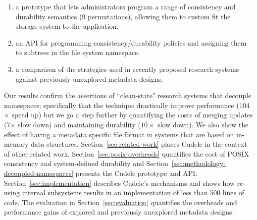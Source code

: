 \begin{enumerate}

  \item a prototype that lets administrators program a range of
  consistency and durability semantics (9 permutations), allowing them to custom
  fit the storage system to the application.

  \item an API for programming consistency/durability policies and assigning
  them to subtrees in the file system namespace.

  \item a comparison of the strategies used in recently proposed research systems against
  previously unexplored metadata designs.

\end{enumerate}

Our results confirm the assertions of ``clean-state" research systems that
decouple namespaces; specifically that the technique drastically improve
performance (104\(\times\) speed up) but we go a step further by quantifying
the costs of merging updates (7\(\times\) slow down) and maintaining durability
(\(10\times\) slow down). We also show the effect of having a metadata specific
file format in systems that are based on in-memory data structures.
Section~\ref{sec:related-work} places Cudele in the context of other related
work. Section~\ref{sec:posix-overheads} quantifies the cost of POSIX
consistency and system-defined durability and
Section~\ref{sec:methodology-decoupled-namespaces} presents the Cudele
prototype and API. Section~\ref{sec:implementation} describes Cudele's
mechanisms and shows how re-using internal subsystems results in an
implementation of less than 500 lines of code. The evaluation in
Section~\ref{sec:evaluation} quantifies the overheads and performance gains of
explored and previously unexplored metadata designs.

